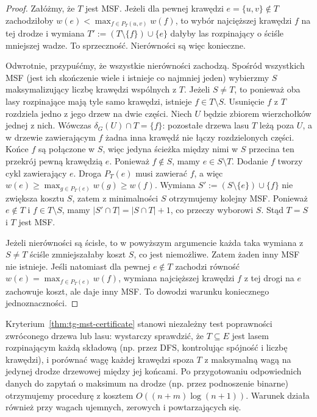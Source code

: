 \begin{proof}
Załóżmy, że $T$ jest MSF.
Jeżeli dla pewnej krawędzi
$e=\{u,v\}\notin T$ zachodziłoby
$w(e)<\max_{f\in P_T(u,v)}w(f)$,
to wybór najcięższej krawędzi
$f$ na tej drodze i wymiana
$T':=(T\setminus\{f\})\cup\{e\}$
dałyby las rozpinający
o ściśle mniejszej wadze.
To sprzeczność.
Nierówności są więc konieczne.

Odwrotnie, przypuśćmy,
że wszystkie nierówności zachodzą.
Spośród wszystkich MSF (jest ich skończenie wiele
i istnieje co najmniej jeden) wybierzmy $S$
maksymalizujący liczbę krawędzi wspólnych z $T$.
Jeżeli $S\ne T$, to ponieważ oba lasy rozpinające
mają tyle samo krawędzi, istnieje $f\in T\setminus S$.
Usunięcie $f$ z $T$ rozdziela jedno z jego drzew
na dwie części. Niech $U$ będzie zbiorem wierzchołków
jednej z nich.
Wówczas $\delta_G(U)\cap T=\{f\}$: pozostałe drzewa
lasu $T$ leżą poza $U$, a w drzewie zawierającym $f$
żadna inna krawędź nie łączy rozdzielonych części.
Końce $f$ są połączone w $S$, więc jedyna ścieżka
między nimi w $S$ przecina ten przekrój pewną
krawędzią $e$. Ponieważ $f\notin S$, mamy
$e\in S\setminus T$. Dodanie $f$ tworzy cykl
zawierający $e$.
Droga $P_T(e)$ musi
zawierać $f$, a więc
$w(e)\geq\max_{g\in P_T(e)}w(g)\geq w(f)$.
Wymiana $S':=(S\setminus\{e\})\cup\{f\}$
nie zwiększa kosztu $S$,
zatem z minimalności $S$
otrzymujemy kolejny MSF.
Ponieważ $e\notin T$ i $f\in T\setminus S$,
mamy $|S'\cap T|=|S\cap T|+1$,
co przeczy wyborowi $S$.
Stąd $T=S$ i $T$ jest MSF.

Jeżeli nierówności są ścisłe,
to w powyższym argumencie
każda taka wymiana z
$S\ne T$ ściśle zmniejszałaby
koszt $S$, co jest niemożliwe.
Zatem żaden inny MSF nie istnieje.
Jeśli natomiast dla pewnej
$e\notin T$ zachodzi równość
$w(e)=\max_{f\in P_T(e)}w(f)$,
wymiana najcięższej krawędzi
$f$ z tej drogi na $e$
zachowuje koszt, ale daje
inny MSF. To dowodzi
warunku koniecznego
jednoznaczności.
\end{proof}

\begin{uwaga}
Kryterium~\ref{thm:tg-mst-certificate}
stanowi niezależny test poprawności
zwróconego drzewa lub lasu:
wystarczy sprawdzić, że $T\subseteq E$ jest lasem
rozpinającym każdą składową (np. przez DFS,
kontrolując spójność i liczbę krawędzi),
i porównać
wagę każdej krawędzi spoza $T$
z maksymalną wagą na jedynej
drodze drzewowej między jej końcami.
Po przygotowaniu odpowiednich danych
do zapytań o maksimum na drodze
(np. przez podnoszenie binarne)
otrzymujemy procedurę z kosztem
$O((n+m)\log(n+1))$.
Warunek działa również przy
wagach ujemnych, zerowych
i powtarzających się.
\end{uwaga}

